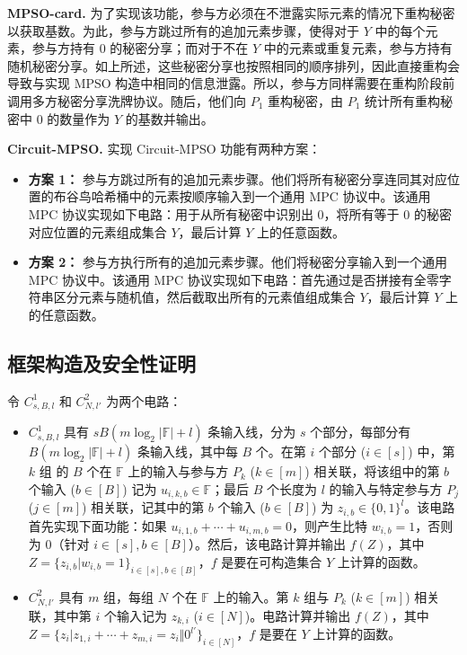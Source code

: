 \noindent\textbf{MPSO-card.} 为了实现该功能，参与方必须在不泄露实际元素的情况下重构秘密以获取基数。为此，参与方跳过所有的追加元素步骤，使得对于 $Y$ 中的每个元素，参与方持有 0 的秘密分享；而对于不在 $Y$ 中的元素或重复元素，参与方持有随机秘密分享。如上所述，这些秘密分享也按照相同的顺序排列，因此直接重构会导致与实现 MPSO 构造中相同的信息泄露。所以，参与方同样需要在重构阶段前调用多方秘密分享洗牌协议。随后，他们向 $P_1$ 重构秘密，由 $P_1$ 统计所有重构秘密中 0 的数量作为 $Y$ 的基数并输出。

\noindent\textbf{Circuit-MPSO.} 实现 Circuit-MPSO 功能有两种方案：
\begin{itemize}[itemsep=2pt,topsep=5pt,parsep=0pt,leftmargin=10pt]
  \item \textbf{方案 1：} 参与方跳过所有的追加元素步骤。他们将所有秘密分享连同其对应位置的布谷鸟哈希桶中的元素按顺序输入到一个通用 MPC 协议中。该通用 MPC 协议实现如下电路：用于从所有秘密中识别出 0，将所有等于 0 的秘密对应位置的元素组成集合 $Y$，最后计算 $Y$ 上的任意函数。
  \item \textbf{方案 2：} 参与方执行所有的追加元素步骤。他们将秘密分享输入到一个通用 MPC 协议中。该通用 MPC 协议实现如下电路：首先通过是否拼接有全零字符串区分元素与随机值，然后截取出所有的元素值组成集合 $Y$，最后计算 $Y$ 上的任意函数。
\end{itemize}

\subsection{框架构造及安全性证明}\label{sec:mpso}

令 $C_{s,B,l}^1$ 和 $C_{N,l'}^2$ 为两个电路：
\begin{itemize}[itemsep=2pt,topsep=5pt,parsep=0pt,leftmargin=10pt]
\item $C_{s,B,l}^1$ 具有 $sB(m\log_2\lvert \mathbb{F} \rvert+ l)$ 条输入线，分为 $s$ 个部分，每部分有 $B(m\log_2\lvert \mathbb{F} \rvert + l)$ 条输入线，其中每 $B$ 个。在第 $i$ 个部分 ($i \in [s]$) 中，第 $k$ 组 的 $B$ 个在 $\mathbb{F}$ 上的输入与参与方 $P_k$ ($k \in [m]$) 相关联，将该组中的第 $b$ 个输入 ($b \in [B]$) 记为 $u_{i,k,b} \in \mathbb{F}$；最后 $B$ 个长度为 $l$ 的输入与特定参与方 $P_j$ ($j \in [m]$) 相关联，记其中的第 $b$ 个输入 ($b \in [B]$) 为 $z_{i,b} \in \{0,1\}^l$。该电路首先实现下面功能：如果 $u_{i,1,b} + \cdots + u_{i,m,b} = 0$，则产生比特 $w_{i,b} = 1$，否则为 0（针对 $i \in [s], b \in [B]$）。然后，该电路计算并输出 $f(Z)$，其中 $Z = \{z_{i,b} \vert w_{i,b} = 1\}_{i \in [s], b \in [B]}$，$f$ 是要在可构造集合 $Y$ 上计算的函数。
\item $C_{N,l'}^2$ 具有 $m$ 组，每组 $N$ 个在 $\mathbb{F}$ 上的输入。第 $k$ 组与 $P_k$ ($k \in [m]$) 相关联，其中第 $i$ 个输入记为 $z_{k,i}$ ($i \in [N]$)。电路计算并输出 $f(Z)$，其中 $Z = \{z_i \vert z_{1,i} + \cdots + z_{m,i} = z_i \Vert 0^{l'}\}_{i \in [N]}$，$f$ 是要在 $Y$ 上计算的函数。
\end{itemize}

